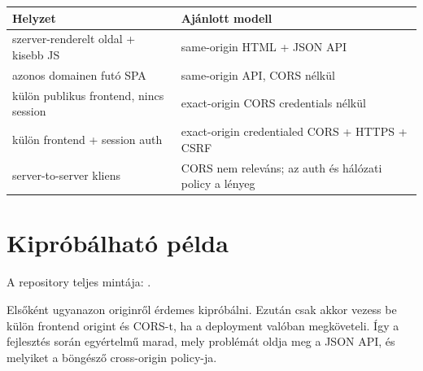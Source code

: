 \begin{center}
\begin{tabularx}{\textwidth}{@{}L{0.27\textwidth}Y@{}}
\toprule
\textbf{Helyzet} & \textbf{Ajánlott modell} \\
\midrule
szerver-renderelt oldal + kisebb JS & same-origin HTML + JSON API \\
azonos domainen futó SPA & same-origin API, CORS nélkül \\
külön publikus frontend, nincs session & exact-origin CORS credentials nélkül \\
külön frontend + session auth & exact-origin credentialed CORS + HTTPS + CSRF \\
server-to-server kliens & CORS nem releváns; az auth és hálózati policy a lényeg \\
\bottomrule
\end{tabularx}
\end{center}

\section{Kipróbálható példa}

A repository teljes mintája: .

Elsőként ugyanazon originről érdemes kipróbálni. Ezután csak akkor vezess be külön frontend origint és CORS-t, ha a deployment valóban megköveteli. Így a fejlesztés során egyértelmű marad, mely problémát oldja meg a JSON API, és melyiket a böngésző cross-origin policy-ja.
